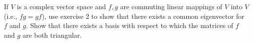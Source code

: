 If $V$ is a complex vector space and $f, g$ are commuting linear mappings of $V$ into $V$ (i.e., $fg = gf$), use exercise 2 to show that there exists a common eigenvector for $f$ and $g$. Show that there exists a basis with respect to which the matrices of $f$ and $g$ are both triangular.
